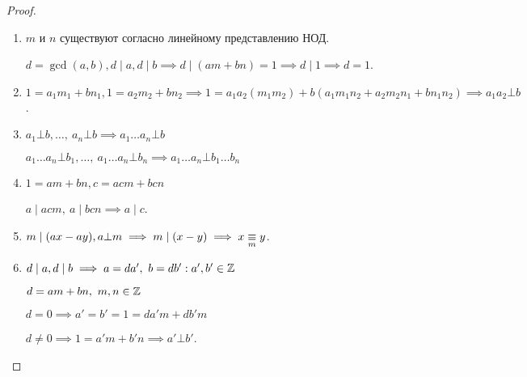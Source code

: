 \begin{proof}
    \begin{enumerate}
        \item $m$ и $n$ существуют согласно линейному представлению НОД.
        
        $d = \gcd(a, b), d \mid a, d \mid b \implies d \mid (am + bn) = 1 \implies d \mid 1 \implies d = 1$.
        
        \item $1 = a_1m_1 + bn_1, 1 = a_2m_2 + bn_2 \implies 1 = a_1a_2(m_1m_2) + b(a_1m_1n_2 + a_2m_2n_1+bn_1n_2) \implies a_1a_2 \bot b$.
        
        \item $a_1 \bot b, \ldots,~a_n \bot b \implies a_1 \ldots a_n \bot b$
        
        $a_1 \ldots a_n \bot b_1, \ldots,~a_1 \ldots a_n \bot b_n \implies a_1 \ldots a_n \bot b_1 \ldots b_n$
        
        \item $1 = am + bn, c = acm + bcn$
        
        $a \mid acm,~a \mid bcn \implies a \mid c$.
        
        \item $m \mid (ax - ay), a \bot m \implies m \mid (x - y) \implies x \underset{m}{\equiv} y$.
        
        \item $d \mid a, d \mid b \implies a = da',~b=db': a', b' \in \mathbb{Z}$
        
        $d = am + bn,~m, n \in \mathbb{Z}$
        
        $d = 0 \implies a' = b' = 1 = da'm + db'm$
        
        $d \neq 0 \implies 1 = a'm + b'n \implies a' \bot b'$.
    \end{enumerate}
\end{proof}